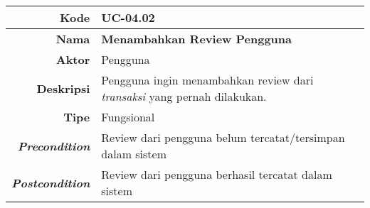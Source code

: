 	
	
	\begin{table}[H]
		\centering
		\begin{tabular}{|r|p{8cm}|}
			\hline
			\textbf{Kode}                                                    
			& UC-04.02
			\\ \hline
			\textbf{Nama}                                                    
			& \textbf{ Menambahkan Review Pengguna } 
			\\ \hline
			\textbf{Aktor}                                                   
			& Pengguna 
			\\ \hline
			\textbf{Deskripsi}                                               
			& Pengguna ingin menambahkan review dari \textit{transaksi} yang pernah dilakukan.
			\\ \hline
			\textbf{Tipe}
			& Fungsional 
			\\ \hline
			
			\textbf{\textit{Precondition}}
			& Review dari pengguna belum tercatat/tersimpan dalam sistem

			\\ \hline
			
			\textbf{\textit{Postcondition}} 
			& Review dari pengguna berhasil tercatat dalam sistem
			\\ \hline
			

\end{tabular}
\end{table}
